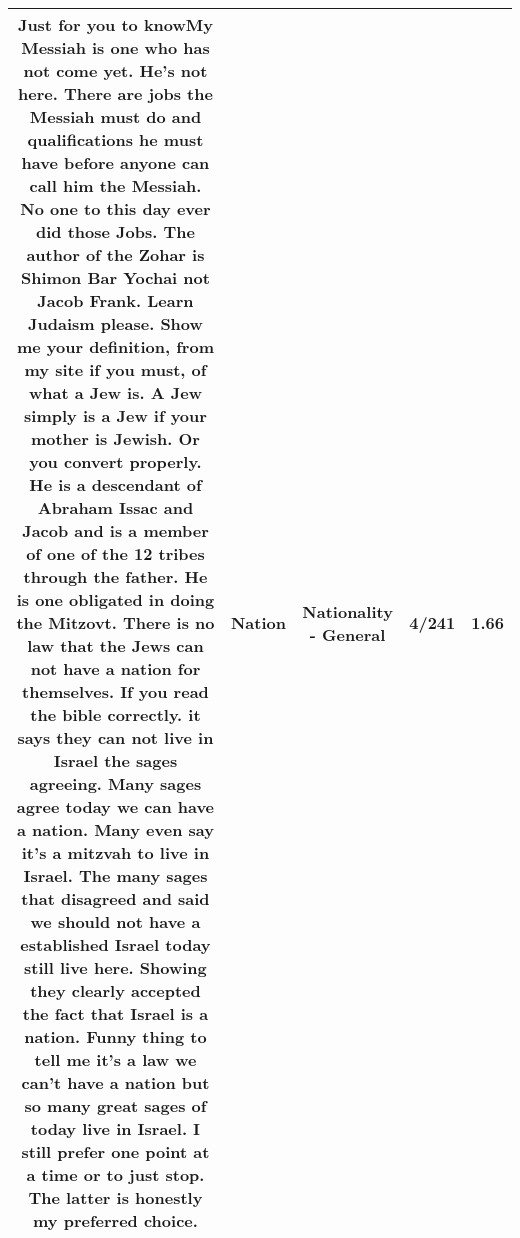 \documentclass[11pt]{article}
\newlength\mylength
\begin{document}
\begin{center}
\begin{longtable}{|C{.65\mylength}|C{.30\mylength}|C{.12\mylength}|C{.12\mylength}|C{.12\mylength}|}
  \small Just for you to knowMy Messiah is one who has not come yet. He's not here. There are jobs the Messiah must do and qualifications he must  have before anyone can call him the Messiah. No one to this day ever did those Jobs.   The author of the Zohar is Shimon Bar Yochai not Jacob Frank. Learn Judaism please. Show me your definition, from my site if you must, of what a Jew is.  A Jew simply is a Jew if your mother is Jewish. Or you convert properly. He is a descendant of Abraham Issac and Jacob and is a member of one of the 12 tribes through the father.  He is one obligated in doing the Mitzovt. There is no law that the Jews can not have a \textbf{nation} for themselves. If you read the bible correctly. it says they can not live in Israel the sages agreeing. Many sages agree today we can have a \textbf{nation}. Many even say it's a mitzvah  to live in Israel. The many sages that disagreed and said we should not have a established Israel today still live here. Showing they clearly accepted the fact that Israel is a \textbf{nation}. Funny thing to tell me it's a law we can't have a \textbf{nation} but so many great sages of today live in Israel. I still prefer one point at a time or to just stop. The latter is honestly my preferred choice.\normalsize   & Nation & Nationality - General & 4/241 & 1.66 \\  \hline

\end{longtable}
\end{center}
\end{document}
